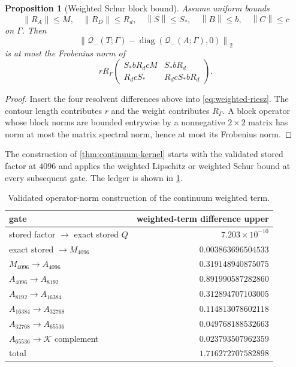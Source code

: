 \documentclass[11pt]{article}
\newtheorem{proposition}[theorem]{Proposition}
\theoremstyle{definition}
\theoremstyle{remark}
\newcommand{\cK}{\mathcal K}
\newcommand{\cQ}{\mathcal Q}
\newcommand{\norm}[1]{\left\lVert #1\right\rVert}
\begin{document}
\begin{proposition}[Weighted Schur block bound]
\label{prop:weighted-schur}
Assume uniform bounds
\[
 \norm{R_A}\le M,
 \quad\norm{R_D}\le R_d,
 \quad\norm S\le S_*,
 \quad\norm B\le b,
 \quad\norm C\le c
\]
on $\Gamma$.  Then
\[
 \norm{\cQ_-(T;\Gamma)-
       \operatorname{diag}(\cQ_-(A;\Gamma),0)}_2
\]
is at most the Frobenius norm of
\begin{equation}
 rR_\Gamma
 \begin{pmatrix}
 S_*bR_dcM&S_*bR_d\\
 R_dcS_*&R_dcS_*bR_d
 \end{pmatrix}.
 \label{eq:weighted-schur-majorant}
\end{equation}
\end{proposition}

\begin{proof}
Insert the four resolvent differences above into
\eqref{eq:weighted-riesz}.  The contour length contributes $r$ and the
weight contributes $R_\Gamma$.  A block operator whose block norms are
bounded entrywise by a nonnegative $2\times2$ matrix has norm at most the
matrix spectral norm, hence at most its Frobenius norm.
\end{proof}

The construction of \cref{thm:continuum-kernel} starts with the validated
stored factor at $4096$ and applies the weighted Lipschitz or weighted Schur
bound at every subsequent gate.  The ledger is shown in
\cref{tab:weighted-chain}.

\begin{table}[H]
\centering
\caption{Validated operator-norm construction of the continuum weighted term.}
\label{tab:weighted-chain}
\begin{tabular}{@{}lr@{}}
\toprule
gate & weighted-term difference upper\\
\midrule
stored factor $\to$ exact stored $Q$ & $7.203\times10^{-10}$\\
exact stored $\to M_{4096}$ & $0.003863696504533$\\
$M_{4096}\to A_{4096}$ & $0.319148940875075$\\
$A_{4096}\to A_{8192}$ & $0.891990587282860$\\
$A_{8192}\to A_{16384}$ & $0.312894707103005$\\
$A_{16384}\to A_{32768}$ & $0.114813078602118$\\
$A_{32768}\to A_{65536}$ & $0.049768188532663$\\
$A_{65536}\to\cK$ complement & $0.023793507962359$\\
\midrule
total & $1.716272707582898$\\
\bottomrule
\end{tabular}
\end{table}
\end{document}
